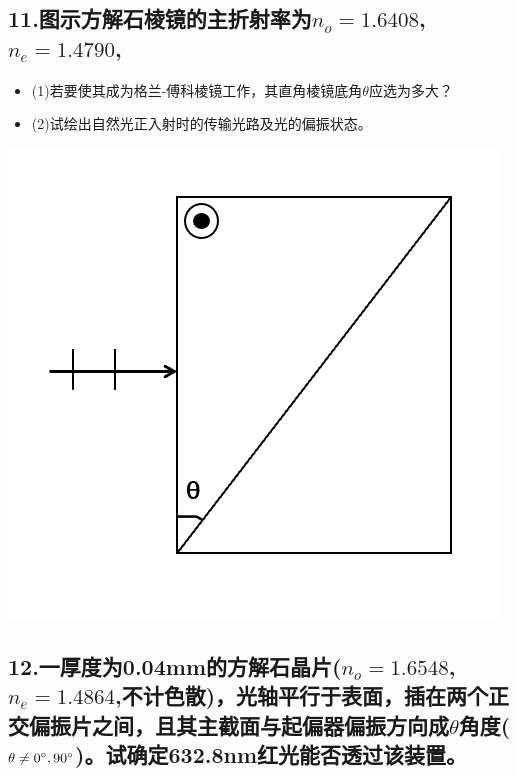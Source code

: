 \documentclass[11pt,a4paper]{article}
\begin{document}
    \subsection*{11.图示方解石棱镜的主折射率为$n_o=1.6408$,$n_e=1.4790$,}
    \begin{itemize}
        \vspace{0mm}
        \item (1)若要使其成为格兰-傅科棱镜工作，其直角棱镜底角$\theta$应选为多大？
        \vspace{0mm}
        \item (2)试绘出自然光正入射时的传输光路及光的偏振状态。
    \end{itemize}
    \includegraphics[scale=0.2]{4.png}%
    \vspace{10mm}
    \subsection*{12.一厚度为0.04mm的方解石晶片($n_o=1.6548$,$n_e=1.4864$,不计色散)，光轴平行于表面，插在两个正交偏振片之间，且其主截面与起偏器偏振方向成$\theta$角度($\theta\neq 0\degree,90\degree$)。试确定632.8nm红光能否透过该装置。}
    \vspace{10mm}
\end{document}
